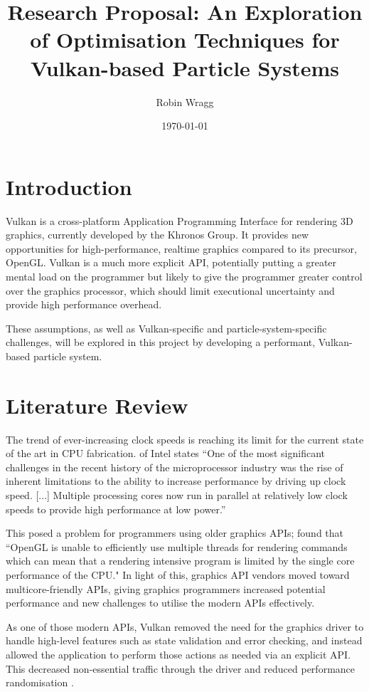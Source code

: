 \documentclass[10pt, a4paper, twocolumn]{article}
\title{\sffamily\bfseries Research Proposal: An Exploration of Optimisation Techniques for Vulkan-based Particle Systems}
\author{Robin Wragg}
\date{\today}
\begin{document}
\maketitle




\section{Introduction}
Vulkan is a cross-platform Application Programming Interface for rendering 3D graphics, currently developed by the Khronos Group. It provides new opportunities for high-performance, realtime graphics compared to its precursor, OpenGL. Vulkan is a much more explicit API, potentially putting a greater mental load on the programmer but likely to give the programmer greater control over the graphics processor, which should limit executional uncertainty and provide high performance overhead.

These assumptions, as well as Vulkan-specific and particle-system-specific challenges, will be explored in this project by developing a performant, Vulkan-based particle system.





\section{Literature Review}
The trend of ever-increasing clock speeds is reaching its limit for the current state of the art in CPU fabrication. \citet{Gillespie2008} of Intel states ``One of the most significant challenges in the recent history of the microprocessor industry was the rise of inherent limitations to the ability to increase performance by driving up clock speed. [...] Multiple processing cores now run in parallel at relatively low clock speeds to provide high performance at low power.''

This posed a problem for programmers using older graphics APIs; \citet{evalMultiThreadVulkan} found that ``OpenGL is unable to efficiently use multiple threads for rendering commands which can mean that a rendering intensive program is limited by the single core performance of the CPU." In light of this, graphics API vendors moved toward multicore-friendly APIs, giving graphics programmers increased potential performance and new challenges to utilise the modern APIs effectively.

As one of those modern APIs, Vulkan removed the need for the graphics driver to handle high-level features such as state validation and error checking, and instead allowed the application to perform those actions as needed via an explicit API. This decreased non-essential traffic through the driver and reduced performance randomisation \citep[p. 23]{Joseph2016}.
\end{document}
